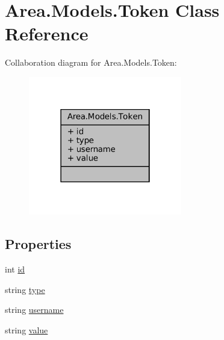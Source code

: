 \hypertarget{classArea_1_1Models_1_1Token}{}\section{Area.\+Models.\+Token Class Reference}
\label{classArea_1_1Models_1_1Token}


Collaboration diagram for Area.\+Models.\+Token\+:
\nopagebreak
\begin{figure}[H]
\begin{center}
\leavevmode
\includegraphics[width=190pt]{classArea_1_1Models_1_1Token__coll__graph}
\end{center}
\end{figure}
\subsection*{Properties}
\begin{DoxyCompactItemize}
\item 
int \mbox{\hyperlink{classArea_1_1Models_1_1Token_aafd3c1fb9e2a3aa46a06218421117a86}{id}}
\item 
string \mbox{\hyperlink{classArea_1_1Models_1_1Token_ae073ecd1eb3376b1c419f600d232e815}{type}}
\item 
string \mbox{\hyperlink{classArea_1_1Models_1_1Token_a9c0383e282fba4e7ef6356eb5271661d}{username}}
\item 
string \mbox{\hyperlink{classArea_1_1Models_1_1Token_a7f78445edc78ec68eed946a967b8a227}{value}}
\end{DoxyCompactItemize}


